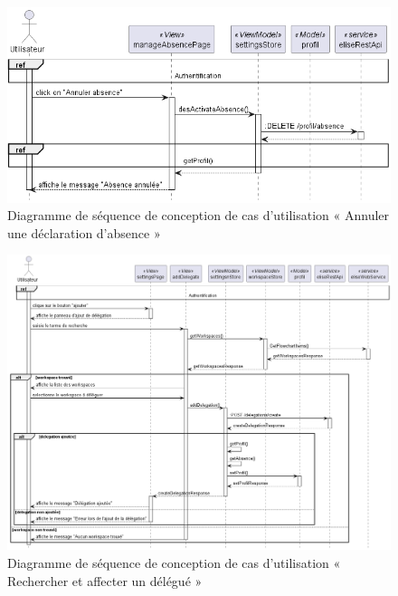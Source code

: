 \begin{figure}[H]
  \centering
  \includegraphics[width=1\textwidth]{out/diagrams/sprint6/sequence_annuler_absence/sequence_annuler_absence}
  \caption{Diagramme de séquence de conception de cas d'utilisation « Annuler une déclaration d'absence »}
  \label{fig:conception_sequence_annuler_absence}
\end{figure}

\begin{figure}[H]
  \centering
  \includegraphics[width=1\textwidth]{out/diagrams/sprint6/sequence_search_affect_delegation/sequence_search_affect_delegation}
  \caption{Diagramme de séquence de conception de cas d'utilisation «  Rechercher et affecter un délégué »}
  \label{fig:conception_sequence_search_affect_delegation}
\end{figure}

